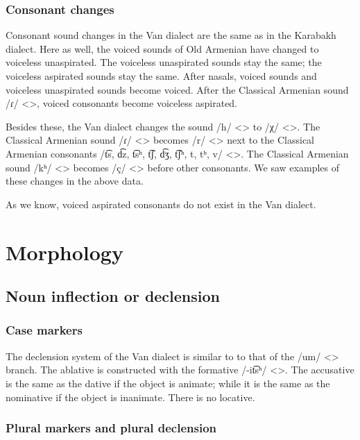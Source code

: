 \subsubsection{Consonant changes}\label{section:van:phono:change:cons}

Consonant sound changes in the Van dialect are the same as in the Karabakh dialect. Here as well, the voiced sounds of Old Armenian have changed to voiceless unaspirated. The voiceless unaspirated sounds stay the same; the voiceless aspirated sounds stay the same. After nasals, voiced sounds and voiceless unaspirated sounds become voiced. After the Classical Armenian sound /ɾ/ <>, voiced consonants become voiceless aspirated. 

Besides these, the Van dialect changes the sound /h/ <> to /χ/ <>. The Classical Armenian sound /ɾ/ <> becomes /r/ <> next to the Classical Armenian consonants /t͡s, d͡z, t͡sʰ, t͡ʃ, d͡ʒ, t͡ʃʰ, t, tʰ, v/ <>. The Classical Armenian sound /kʰ/ <> becomes /ç/ <> before other consonants. We saw examples of these changes in the above data. 


\begin{adjarianpage}\label{page:143}\end{adjarianpage}%

As we know, voiced aspirated consonants do not exist in the Van dialect. 

\section{Morphology}
\subsection{Noun inflection or declension}

\subsubsection{Case markers}
The declension system of the Van dialect is similar to to that of the /um/ <> branch. The ablative is constructed with the formative /-it͡sʰ/ <>. The accusative is the same as the dative if the object is animate; while it is the same as the nominative if the object is inanimate. There is no locative. 

\subsubsection{Plural markers and plural declension}

